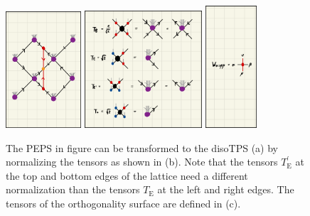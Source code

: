 \begin{figure}
	\centering
	\subcaptionbox{\label{fig:toric_code_disoTPS_representation}}
	{%
		\includegraphics[width=0.25\textwidth]{figures/Toric_Code/toric_code_disoTPS.jpeg}
	}
	\subcaptionbox{\label{fig:toric_code_disoTPS_representation_tensor_definitions}}
	{%
		\includegraphics[width=0.39\textwidth]{figures/Toric_Code/toric_code_disoTPS_tensor_definitions.jpeg}
	}
	\subcaptionbox{\label{fig:toric_code_disoTPS_representation_ortho_surface_tensor}}
	{%
		\includegraphics[width=0.17\textwidth]{figures/Toric_Code/toric_code_disoTPS_ortho_surface_tensor.jpeg}
	}
	\caption{The PEPS in figure \protect{} can be transformed to the disoTPS (a) by normalizing the tensors as shown in (b). Note that the tensors $T_\text{E}^\prime$ at the top and bottom edges of the lattice need a different normalization than the tensors $T_\text{E}$ at the left and right edges. The tensors of the orthogonality surface are defined in (c).}
	\label{fig:toric_code_disoTPS}
\end{figure}
